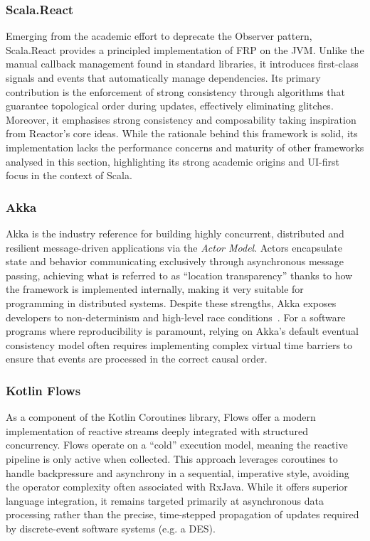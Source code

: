 \subsubsection{Scala.React}
Emerging from the academic effort to deprecate the Observer pattern,
Scala.React provides a principled implementation of \ac{FRP} on the \ac{JVM}.
Unlike the manual callback management found in standard libraries, it
introduces first-class signals and events that automatically manage
dependencies. Its primary contribution is the enforcement of strong consistency
through algorithms that guarantee topological order during updates, effectively
eliminating glitches. Moreover, it emphasises strong consistency and
composability taking inspiration from Reactor's core ideas. While the rationale
behind this framework is solid, its implementation lacks the performance
concerns and maturity of other frameworks analysed in this section,
highlighting its strong academic origins and UI-first focus in the context of
Scala.

\subsubsection{Akka}
Akka is the industry reference for building highly concurrent, distributed and
resilient message-driven applications via the \emph{Actor Model}. Actors
encapsulate state and behavior communicating exclusively through asynchronous
message passing, achieving what is referred to as ``location transparency''
thanks to how the framework is implemented internally, making it very suitable
for programming in distributed systems. Despite these strengths, Akka exposes
developers to non-determinism and high-level race
conditions~\cite{menard2023LF}. For a software programs where reproducibility
is paramount, relying on Akka's default eventual consistency model often
requires implementing complex virtual time barriers to ensure that events are
processed in the correct causal order.

\subsubsection{Kotlin Flows}
As a component of the Kotlin Coroutines library, Flows offer a modern
implementation of reactive streams deeply integrated with structured
concurrency. Flows operate on a ``cold'' execution model, meaning the reactive
pipeline is only active when collected. This approach leverages coroutines to
handle backpressure and asynchrony in a sequential, imperative style, avoiding
the operator complexity often associated with RxJava. While it offers superior
language integration, it remains targeted primarily at asynchronous data
processing rather than the precise, time-stepped propagation of updates
required by discrete-event software systems (e.g. a \ac{DES}).

